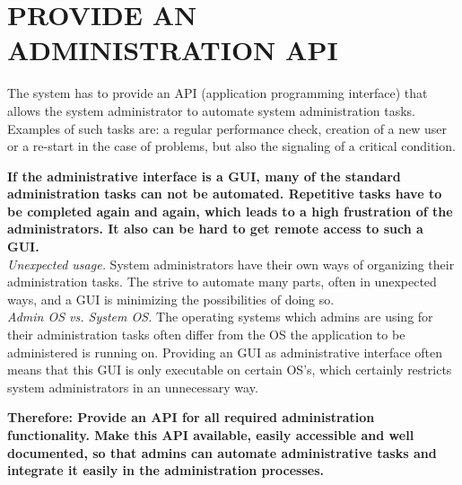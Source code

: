 \newpage
\section*{PROVIDE AN ADMINISTRATION API}

The system has to provide an API (application programming interface) that allows the system administrator to automate system administration tasks. Examples of such tasks are: a regular performance check, creation of a new user or a re-start in the case of problems, but also the signaling of a critical condition.  

\begin{center}
  
\end{center}

\textbf{If the administrative interface is a GUI, many of the standard administration tasks can not be automated. Repetitive tasks have to be completed again and again, which leads to a high frustration of the administrators. It also can be hard to get remote access to such a GUI.}\\

\textit{Unexpected usage.} System administrators have their own ways of organizing their administration tasks. The strive to automate many parts, often in unexpected ways, and a GUI is minimizing the possibilities of doing so.\\

\textit{Admin OS vs. System OS.} The operating systems which admins are using for their administration tasks often differ from the OS the application to be administered is running on. Providing an GUI as administrative interface often means that this GUI is only executable on certain OS's, which certainly restricts system administrators in an unnecessary way.

\begin{center}
   
\end{center}

\textbf{Therefore: Provide an API for all required administration functionality. Make this API available, easily accessible and well documented, so that admins can automate administrative tasks and integrate it easily in the administration processes.}\\

